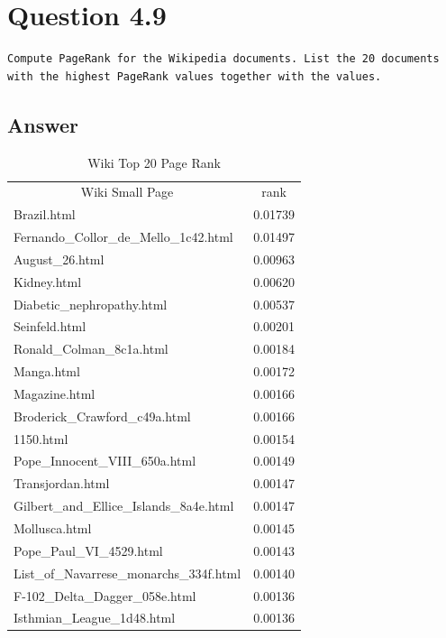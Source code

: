 \documentclass[11pt]{article}
\newenvironment{code}{\captionsetup{type=listing}}{}
\begin{document}
\section{Question 4.9}
\label{q:pr}
\begin{verbatim}
Compute PageRank for the Wikipedia documents. List the 20 documents
with the highest PageRank values together with the values.
\end{verbatim}
\subsection{Answer}
\begin{code}
	 \label{code:pr}
\end{code}
\begin{table}[h]
\centering
\caption{Wiki Top 20 Page Rank}
\label{tb:wpr} 
\begin{minipage}{.5\textwidth}
\begin{tabular}{lc|}
\multicolumn{1}{c}{Wiki Small Page} & \multicolumn{1}{c|}{rank} \\
Brazil.html & 0.01739 \\
Fernando\_Collor\_de\_Mello\_1c42.html & 0.01497 \\
August\_26.html & 0.00963 \\
Kidney.html & 0.00620 \\
Diabetic\_nephropathy.html & 0.00537 \\
Seinfeld.html & 0.00201 \\
Ronald\_Colman\_8c1a.html & 0.00184 \\
Manga.html & 0.00172 \\
Magazine.html & 0.00166 \\
Broderick\_Crawford\_c49a.html & 0.00166 \\
1150.html & 0.00154 \\
Pope\_Innocent\_VIII\_650a.html & 0.00149 \\
Transjordan.html & 0.00147 \\
Gilbert\_and\_Ellice\_Islands\_8a4e.html & 0.00147 \\
Mollusca.html & 0.00145 \\
Pope\_Paul\_VI\_4529.html & 0.00143 \\
List\_of\_Navarrese\_monarchs\_334f.html & 0.00140 \\
F-102\_Delta\_Dagger\_058e.html & 0.00136 \\
Isthmian\_League\_1d48.html & 0.00136 \\

\end{tabular}
\end{minipage}
\end{table}
\end{document}
